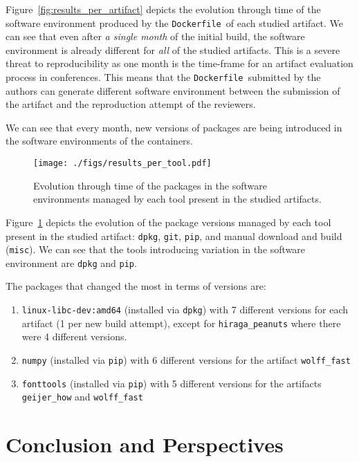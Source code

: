 \documentclass[sigconf,natbib=false]{acmart}
\newcommand{\df}{\texttt{Dockerfile}}
\begin{document}
Figure~\ref{fig:results_per_artifact} depicts the evolution through time of the software environment produced by the \df\ of each studied artifact.
We can see that even after \emph{a single month} of the initial build, the software environment is already different for \emph{all} of the studied artifacts.
This is a severe threat to reproducibility as one month is the time-frame for an artifact evaluation process in conferences.
This means that the \df\ submitted by the authors can generate different software environment between the submission of the artifact and the reproduction attempt of the reviewers.


We can see that every month, new versions of packages are being introduced in the software environments of the containers.



\begin{figure}
  \centering
  \texttt{[image: ./figs/results\_per\_tool.pdf]}
  \caption{
    Evolution through time of the packages in the software environments managed by each tool present in the studied artifacts.
  }\label{fig:results_per_tool}
\end{figure}

Figure~\ref{fig:results_per_tool} depicts the evolution of the package versions managed by each tool present in the studied artifact: \texttt{dpkg}, \texttt{git}, \texttt{pip}, and manual download and build (\texttt{misc}).
We can see that the tools introducing variation in the software environment are \texttt{dpkg} and \texttt{pip}.

The packages that changed the most in terms of versions are:
\begin{enumerate}
\item \texttt{linux-libc-dev:amd64} (installed via \texttt{dpkg}) with 7 different versions for each artifact (1 per new build attempt), except for \texttt{hiraga\_peanuts} where there were 4 different versions.
\item \texttt{numpy} (installed via \texttt{pip}) with 6 different versions for the artifact \texttt{wolff\_fast}
\item \texttt{fonttools} (installed via \texttt{pip}) with 5 different versions for the artifacts \texttt{geijer\_how} and \texttt{wolff\_fast}
\end{enumerate}


\section{Conclusion and Perspectives}\label{sec:conclusion}
\end{document}
